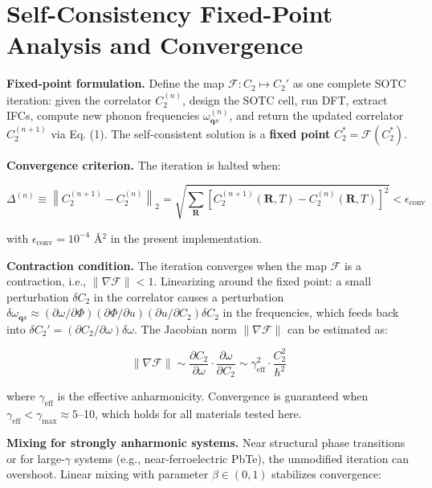 \documentclass[aps,prb,reprint,amsmath,amssymb,floatfix]{revtex4-2}
\begin{document}
\section{Self-Consistency Fixed-Point Analysis and
Convergence}\label{appendix-f-self-consistency-fixed-point-analysis-and-convergence}

\textbf{Fixed-point formulation.} Define the map
\(\mathcal{F}: C_2 \mapsto C_2'\) as one complete SOTC iteration: given
the correlator \(C_2^{(n)}\), design the SOTC cell, run DFT, extract
IFCs, compute new phonon frequencies \(\omega_{\mathbf{q}s}^{(n)}\), and
return the updated correlator \(C_2^{(n+1)}\) via Eq. (1). The
self-consistent solution is a \textbf{fixed point}
\(C_2^* = \mathcal{F}(C_2^*)\).

\textbf{Convergence criterion.} The iteration is halted when:

{\scriptsize
\begin{equation*}
\Delta^{(n)} \equiv \left\|C_2^{(n+1)} - C_2^{(n)}\right\|_2 = \sqrt{\sum_\mathbf{R}\left[C_2^{(n+1)}(\mathbf{R},T) - C_2^{(n)}(\mathbf{R},T)\right]^2} < \epsilon_\text{conv}
\end{equation*}
}

with \(\epsilon_\text{conv} = 10^{-4}\) Å\(^2\) in the present
implementation.

\textbf{Contraction condition.} The iteration converges when the map
\(\mathcal{F}\) is a contraction, i.e., \(\|\nabla\mathcal{F}\| < 1\).
Linearizing around the fixed point: a small perturbation \(\delta C_2\)
in the correlator causes a perturbation
\(\delta\omega_{\mathbf{q}s} \approx (\partial\omega/\partial\Phi)(\partial\Phi/\partial u)(\partial u/\partial C_2)\delta C_2\)
in the frequencies, which feeds back into
\(\delta C_2' = (\partial C_2/\partial\omega)\delta\omega\). The
Jacobian norm \(\|\nabla\mathcal{F}\|\) can be estimated as:

\begin{equation*}
\|\nabla\mathcal{F}\| \sim \frac{\partial C_2}{\partial\omega}\cdot\frac{\partial\omega}{\partial C_2} \sim \gamma_\text{eff}^2 \cdot \frac{C_2^2}{\hbar^2}
\end{equation*}

where \(\gamma_\text{eff}\) is the effective anharmonicity. Convergence
is guaranteed when
\(\gamma_\text{eff} < \gamma_\text{max} \approx 5\)--10, which holds for
all materials tested here.

\textbf{Mixing for strongly anharmonic systems.} Near structural phase
transitions or for large-\(\gamma\) systems (e.g., near-ferroelectric
PbTe), the unmodified iteration can overshoot. Linear mixing with
parameter \(\beta \in (0,1)\) stabilizes convergence:
\end{document}
